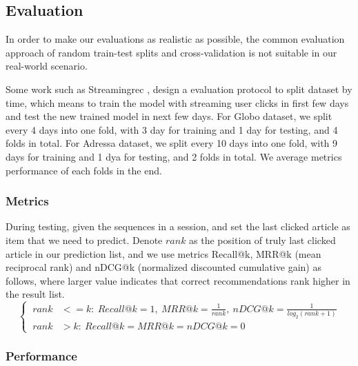 \subsection{Evaluation}
In order to make our evaluations as realistic as possible, the common evaluation approach of random train-test splits and cross-validation is not suitable in our real-world scenario.

Some work such as Streamingrec \cite{jugovac_streamingrec:_2018}, design a evaluation protocol to split dataset by time, which means to train the model with streaming user clicks in first few days and test the new trained model in next few days. For Globo dataset, we split every 4 days into one fold, with 3 day for training and 1 day for testing, and 4 folds in total. For Adressa dataset, we split every 10 days into one fold, with 9 days for training and 1 dya for testing, and 2 folds in total. We average metrics performance of each folds in the end.

\subsubsection{Metrics}

During testing, given the sequences in a session, and set the last clicked article as item that we need to predict. Denote $rank$ as the position of truly last clicked article in our prediction list, and we use metrics Recall@k, MRR@k (mean reciprocal rank) and nDCG@k (normalized discounted cumulative gain) as follows, where larger value indicates that correct recommendations rank higher in the result list.
\begin{equation}
  \left\{
  \begin{aligned}
      ~rank&<=k:~Recall@k = 1,~MRR@k = \frac{1}{rank},~nDCG@k = \frac{1}{log_2(rank+1)}\\
      ~rank&>k:~Recall@k =MRR@k=nDCG@k=0
  \end{aligned}
  \right.
\end{equation}

\subsubsection{Performance}

